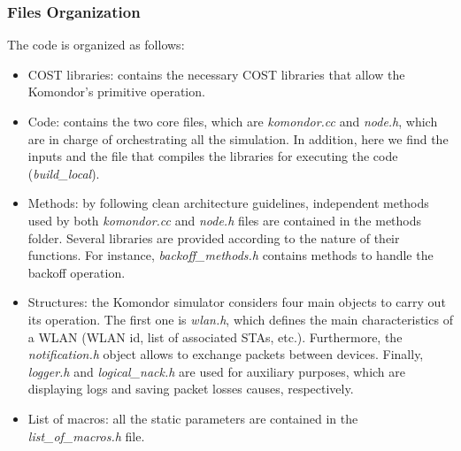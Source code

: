 \documentclass[a4paper]{article}
\begin{document}
		\subsubsection{Files Organization}
		\label{section:files}		
		The code is organized as follows:
		\begin{itemize}
			\item COST libraries: contains the necessary COST libraries that allow the Komondor's primitive operation. 
			\item Code: contains the two core files, which are \emph{komondor.cc} and \emph{node.h}, which are in charge of orchestrating all the simulation. In addition, here we find the inputs and the file that compiles the libraries for executing the code (\emph{build\_local}).
			\item Methods: by following clean architecture guidelines, independent methods used by both \emph{komondor.cc} and \emph{node.h} files are contained in the methods folder. Several libraries are provided according to the nature of their functions. For instance, \emph{backoff\_methods.h} contains methods to handle the backoff operation.
			\item Structures: the Komondor simulator considers four main objects to carry out its operation. The first one is \emph{wlan.h}, which defines the main characteristics of a WLAN (WLAN id, list of associated STAs, etc.). Furthermore, the \emph{notification.h} object allows to exchange packets between devices. Finally, \emph{logger.h} and \emph{logical\_nack.h} are used for auxiliary purposes, which are displaying logs and saving packet losses causes, respectively.
			\item List of macros: all the static parameters are contained in the \emph{list\_of\_macros.h} file. 			
		\end{itemize}
		
\end{document}
